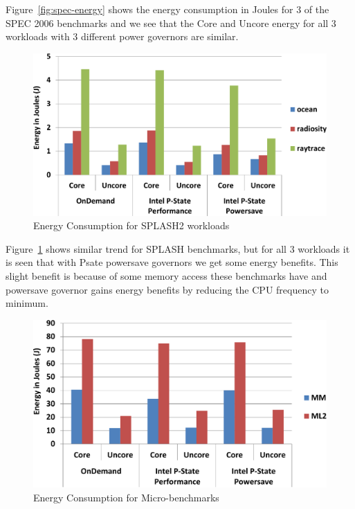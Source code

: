 Figure~\ref{fig:spec-energy} shows the energy consumption in Joules for 3 of the SPEC 2006
benchmarks and we see that the Core and Uncore energy for all 3 workloads with 3 different
power governors are similar. 

\begin{figure}
  \begin{center}
\includegraphics[width=\linewidth]{figs/def-drivers-splash-crop.pdf}
  \end{center}
  \vspace{-0.1in}
  \caption{Energy Consumption for SPLASH2 workloads}
  \label{fig:splash-energy}
\end{figure}


Figure~\ref{fig:splash-energy} shows similar trend for SPLASH benchmarks,
but for all 3 workloads it is seen that with Psate powersave governors we get some energy benefits.
This slight benefit is because of some memory access these benchmarks have and powersave governor
gains energy benefits by reducing the CPU frequency to minimum. 

\begin{figure}
  \begin{center}
\includegraphics[width=\linewidth]{figs/def-drivers-micro-crop.pdf}
  \end{center}
  \vspace{-0.1in}
  \caption{Energy Consumption for Micro-benchmarks}
	\label{fig:micro-energy}
\end{figure}

